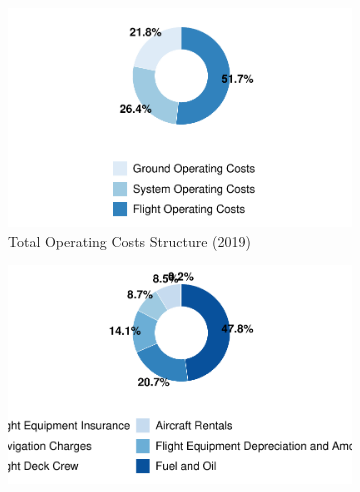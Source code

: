 \documentclass[
  11pt,
  a4paper,
]{book}
\begin{document}
\begin{figure}

\begin{minipage}[t]{0.50\linewidth}

{\centering 

\begin{figure}

{\centering \includegraphics{chapters/aircraft_operating_costs_files/figure-pdf/fig-total-operating-costs-1.pdf}

}

\caption{Total Operating Costs Structure (2019)}

\end{figure}

}

\end{minipage}%
%
\begin{minipage}[t]{0.50\linewidth}

{\centering 

\begin{figure}

{\centering \includegraphics{chapters/aircraft_operating_costs_files/figure-pdf/fig-flight-operating-costs-1.pdf}

}
\end{figure}}
\end{minipage}
\end{figure}
\end{document}
